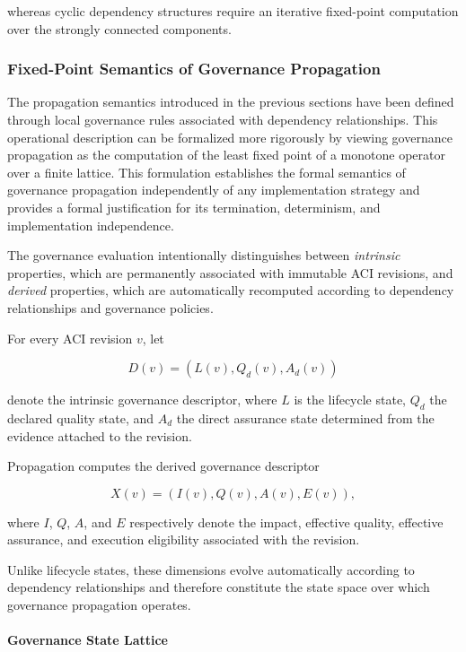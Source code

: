 \documentclass[10pt]{article}
\begin{document}
whereas cyclic dependency structures require an iterative fixed-point
computation over the strongly connected components.

\subsubsection{Fixed-Point Semantics of Governance Propagation}
\label{subsec:fixed_point_semantics}

The propagation semantics introduced in the previous sections have been defined
through local governance rules associated with dependency relationships. This
operational description can be formalized more rigorously by viewing governance
propagation as the computation of the least fixed point of a monotone operator
over a finite lattice. This formulation establishes the formal semantics of
governance propagation independently of any implementation strategy and
provides a formal justification for its termination, determinism, and
implementation independence.

The governance evaluation intentionally distinguishes between
\emph{intrinsic} properties, which are permanently associated with immutable
ACI revisions, and \emph{derived} properties, which are automatically
recomputed according to dependency relationships and governance policies.

For every ACI revision $v$, let

\[
D(v)=
\left(
L(v),
Q_d(v),
A_d(v)
\right)
\]

denote the intrinsic governance descriptor, where $L$ is the lifecycle state,
$Q_d$ the declared quality state, and $A_d$ the direct assurance state
determined from the evidence attached to the revision.

Propagation computes the derived governance descriptor

\[
X(v)=
\left(
I(v),
Q(v),
A(v),
E(v)
\right),
\]

where $I$, $Q$, $A$, and $E$ respectively denote the impact, effective quality,
effective assurance, and execution eligibility associated with the revision.

Unlike lifecycle states, these dimensions evolve automatically according to
dependency relationships and therefore constitute the state space over which
governance propagation operates.


\paragraph{Governance State Lattice}
\end{document}

